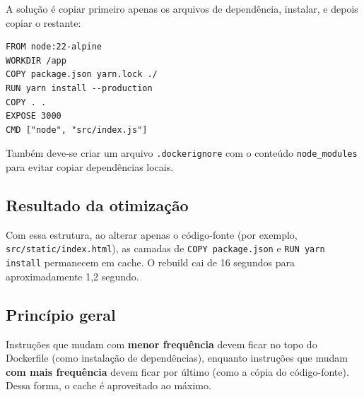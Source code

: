 A solução é copiar primeiro apenas os arquivos de dependência, instalar, e depois copiar o restante:

\begin{verbatim}
FROM node:22-alpine
WORKDIR /app
COPY package.json yarn.lock ./
RUN yarn install --production
COPY . .
EXPOSE 3000
CMD ["node", "src/index.js"]
\end{verbatim}

Também deve-se criar um arquivo \texttt{.dockerignore} com o conteúdo \texttt{node\_modules} para evitar copiar dependências locais.

\subsection{Resultado da otimização}

Com essa estrutura, ao alterar apenas o código-fonte (por exemplo, \texttt{src/static/index.html}), as camadas de \texttt{COPY package.json} e \texttt{RUN yarn install} permanecem em cache. O rebuild cai de 16 segundos para aproximadamente 1,2 segundo.

\subsection{Princípio geral}

Instruções que mudam com \textbf{menor frequência} devem ficar no topo do Dockerfile (como instalação de dependências), enquanto instruções que mudam \textbf{com mais frequência} devem ficar por último (como a cópia do código-fonte). Dessa forma, o cache é aproveitado ao máximo.
